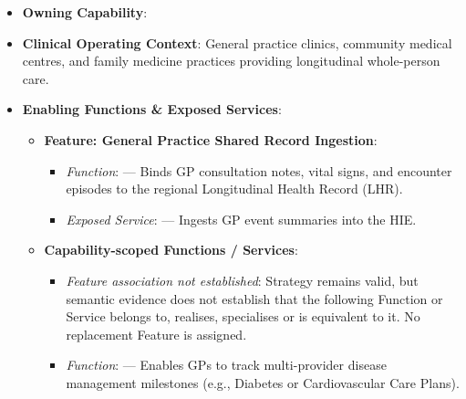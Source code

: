 \begin{itemize}

\item 
\textbf{Owning Capability}: \texttt{}



\item 
\textbf{Clinical Operating Context}: General practice clinics, community medical centres, and family medicine practices providing longitudinal whole-person care.



\item 
\textbf{Enabling Functions \& Exposed Services}:


\begin{itemize}

\item 
\textbf{Feature: General Practice Shared Record Ingestion}:


\begin{itemize}

\item 
\emph{Function}: \texttt{} — Binds GP consultation notes, vital signs, and encounter episodes to the regional Longitudinal Health Record (LHR).



\item 
\emph{Exposed Service}: \texttt{} — Ingests GP event summaries into the HIE.



\end{itemize}


\item 
\textbf{Capability-scoped Functions /\allowbreak{} Services}:


\begin{itemize}

\item 
\emph{Feature association not established}: Strategy \texttt{} remains valid, but semantic evidence does not establish that the following Function or Service belongs to, realises, specialises or is equivalent to it. No replacement Feature is assigned.



\item 
\emph{Function}: \texttt{} — Enables GPs to track multi-provider disease management milestones (e.g., Diabetes or Cardiovascular Care Plans).




\end{itemize}
\end{itemize}
\end{itemize}
